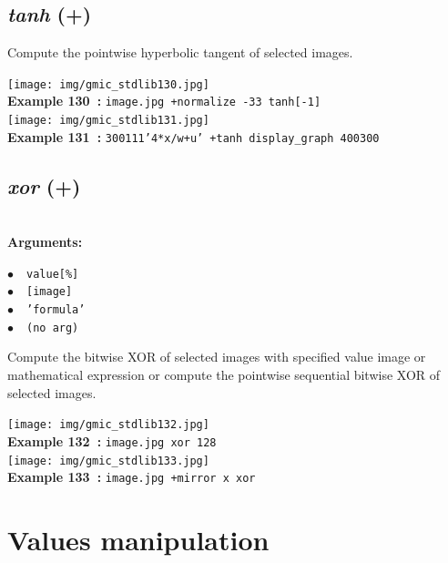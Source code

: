 \documentclass[a4paper,10.5pt,twoside]{book}
\def\comma{\discretionary{,}{}{,}}
\newcommand{\Cb}[1]{\textcolor{cb}{#1}}
\begin{document}
\subsection{\emph{tanh} (+)}\vspace*{-0.7em}
Compute the pointwise hyperbolic tangent of selected images.
\begin{center}\texttt{[image: img/gmic\_stdlib130.jpg]}\\
{\footnotesize \textbf{Example 130~:} \texttt{image.jpg +normalize -3{\comma}3 tanh[-1]}}
\\\texttt{[image: img/gmic\_stdlib131.jpg]}\\
{\footnotesize \textbf{Example 131~:} \texttt{300{\comma}1{\comma}1{\comma}1{\comma}'4*x/w+u' +tanh display\_graph 400{\comma}300}}
\end{center}

\subsection{\emph{xor} (+)}\vspace*{-0.7em}
~\\\textbf{\Cb{Arguments: }}\begin{flushleft}
{\small \Cb{\hspace*{0.5cm}$\bullet$~~\texttt{value[\%]}}}~~~\\
{\small \Cb{\hspace*{0.5cm}$\bullet$~~\texttt{[image]}}}~~~\\
{\small \Cb{\hspace*{0.5cm}$\bullet$~~\texttt{'formula'}}}~~~\\
{\small \Cb{\hspace*{0.5cm}$\bullet$~~\texttt{(no arg)}}}\end{flushleft}
Compute the bitwise XOR of selected images with specified value{\comma} image or mathematical
expression{\comma} or compute the pointwise sequential bitwise XOR of selected images.
\begin{center}\texttt{[image: img/gmic\_stdlib132.jpg]}\\
{\footnotesize \textbf{Example 132~:} \texttt{image.jpg xor 128}}
\\\texttt{[image: img/gmic\_stdlib133.jpg]}\\
{\footnotesize \textbf{Example 133~:} \texttt{image.jpg +mirror x xor}}
\end{center}
\section{Values manipulation}
\end{document}
